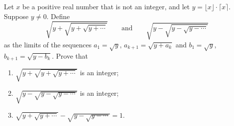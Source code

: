 Let $x$ be a positive real number that is not an integer, and let $y=\lfloor x\rfloor\cdot\lceil x\rceil$. Suppose $y\ne0$. Define
\[\sqrt{y+\sqrt{y+\sqrt{y+\cdots}}}\qquad\text{and}\qquad\sqrt{y-\sqrt{y-\sqrt{y-\cdots}}}\]
as the limits of the sequences $a_1=\sqrt y$, $a_{k+1}=\sqrt{y+a_k}$ and $b_1=\sqrt y$, $b_{k+1}=\sqrt{y-b_k}$. Prove that
\begin{enumerate}
\item[(a)] $\sqrt{y+\sqrt{y+\sqrt{y+\cdots}}}$ is an integer;
\item[(b)] $\sqrt{y-\sqrt{y-\sqrt{y-\cdots}}}$ is an integer;
\item[(c)] $\sqrt{y+\sqrt{y+\cdots}}-\sqrt{y-\sqrt{y-\cdots}}=1$.
\end{enumerate}
